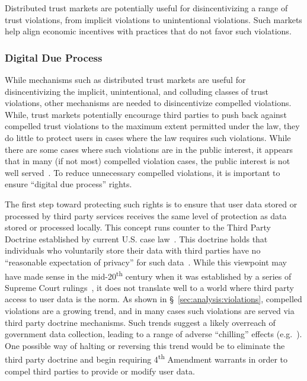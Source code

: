 Distributed trust markets are potentially useful for disincentivizing
a range of trust violations, from implicit violations to unintentional
violations. Such markets help align economic incentives with practices
that do not favor such violations.

\subsubsection{Digital Due Process}

While mechanisms such as distributed trust markets are useful for
disincentivizing the implicit, unintentional, and colluding classes of
trust violations, other mechanisms are needed to disincentivize
compelled violations. While, trust markets potentially encourage third
parties to push back against compelled trust violations to the maximum
extent permitted under the law, they do little to protect users in
cases where the law requires such violations. While there are some
cases where such violations are in the public interest, it appears
that in many (if not most) compelled violation cases, the public
interest is not well served~\cite{greenwald-collect,
  greenwald-prism}. To reduce unnecessary compelled violations, it is
important to ensure ``digital due process'' rights.

The first step toward protecting such rights is to ensure that user
data stored or processed by third party services receives the same
level of protection as data stored or processed locally. This concept
runs counter to the Third Party Doctrine established by current
U.S. case law~\cite{thompson-thirdparty}. This doctrine holds that
individuals who voluntarily store their data with third parties have
no ``reasonable expectation of privacy'' for such
data~\cite{scotus-katzvus}. While this viewpoint may have made sense
in the mid-20\textsuperscript{th} century when it was established by a
series of Supreme Court rulings~\cite{scotus-usvmiller-privacy,
  scotus-smithvmaryland}, it does not translate well to a world where
third party access to user data is the norm. As shown in
\S~\ref{sec:analysis:violations}, compelled violations are a growing
trend, and in many cases such violations are served via third party
doctrine mechanisms. Such trends suggest a likely overreach of
government data collection, leading to a range of adverse ``chilling''
effects (e.g.~\cite{penney2016}). One possible way of halting or
reversing this trend would be to eliminate the third party doctrine
and begin requiring 4\textsuperscript{th} Amendment warrants in order
to compel third parties to provide or modify user data.

